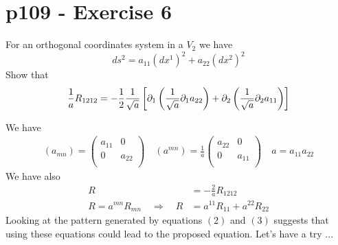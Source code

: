 \section{p109 - Exercise 6}
\begin{tcolorbox}
For an orthogonal coordinates system in a $V_2$ we have $$ ds^2=a_{11}\left( dx^1\right)^2+a_{22}\left( dx^2\right)^2$$
Show that 
$$\frac{1}{a}R_{1212}= -\frac{1}{2}\frac{1}{\sqrt{a}}\left[\partial_1\left(\frac{1}{\sqrt{a}}\partial_1 a_{22}\right)+\partial_2\left(\frac{1}{\sqrt{a}}\partial_2 a_{11}\right)\right]$$
\end{tcolorbox}
We have 
\begin{align}
\left(a_{mn}\right)= \begin{pmatrix}
 a_{11}& 0 \\
 0& a_{22} \\
\end{pmatrix}\quad \left(a^{mn}\right)= \frac{1}{a}\begin{pmatrix}
 a_{22}& 0 \\
 0& a_{11} \\
\end{pmatrix}\quad
 a= a_{11}a_{22}
\end{align}
We have also \\
\begin{align}
R &= -\frac{2}{a}R_{1212}\\
R =  a^{mn}R_{mn}\quad\Rightarrow\quad R &= a^{11}R_{11}+ a^{22}R_{22}
\end{align}
Looking at the pattern generated by equations $(2)$ and $(3)$ suggests that using these equations could lead to the proposed equation. Let's have a try ...
